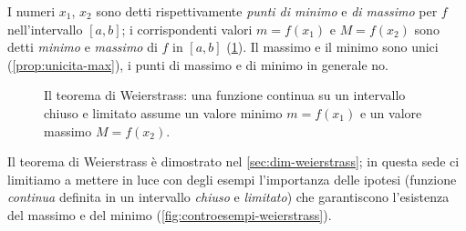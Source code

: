 \begin{schema}
\end{schema}

I numeri $x_{1}$, $x_{2}$ sono detti rispettivamente \emph{punti di minimo} e \emph{di
massimo} per $f$ nell'intervallo $[a,b]$; i corrispondenti valori $m=f(x_{1})$ e
$M=f(x_{2})$ sono detti \emph{minimo} e \emph{massimo} di $f$ in $[a,b]$
(\cref{fig:weierstrass}). Il massimo e il minimo sono unici (\cref{prop:unicita-max}),
i punti di massimo e di minimo in generale no.

\begin{figure}[htb]
\centering
{}
\caption{Il teorema di Weierstrass: una funzione continua su un intervallo chiuso e
limitato assume un valore minimo $m=f(x_{1})$ e un valore massimo $M=f(x_{2})$.}
\label{fig:weierstrass}
\end{figure}

Il teorema di Weierstrass è dimostrato nel \cref{sec:dim-weierstrass}; in questa sede ci
limitiamo a mettere in luce con degli esempi l'importanza delle ipotesi (funzione
\emph{continua} definita in un intervallo \emph{chiuso} e \emph{limitato}) che
garantiscono l'esistenza del massimo e del minimo (\cref{fig:controesempi-weierstrass}).

